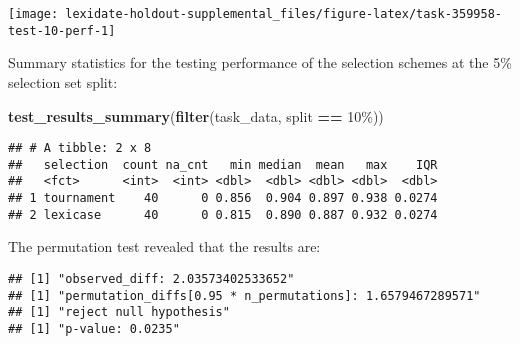 \documentclass[
]{book}
\newenvironment{Shaded}{\begin{snugshade}}{\end{snugshade}}
\newcommand{\AttributeTok}[1]{\textcolor[rgb]{0.13,0.29,0.53}{#1}}
\newcommand{\DecValTok}[1]{\textcolor[rgb]{0.00,0.00,0.81}{#1}}
\newcommand{\FunctionTok}[1]{\textcolor[rgb]{0.13,0.29,0.53}{\textbf{#1}}}
\newcommand{\NormalTok}[1]{#1}
\newcommand{\OtherTok}[1]{\textcolor[rgb]{0.56,0.35,0.01}{#1}}
\newcommand{\SpecialCharTok}[1]{\textcolor[rgb]{0.81,0.36,0.00}{\textbf{#1}}}
\newcommand{\StringTok}[1]{\textcolor[rgb]{0.31,0.60,0.02}{#1}}
\begin{document}
\texttt{[image: lexidate-holdout-supplemental\_files/figure-latex/task-359958-test-10-perf-1]}

Summary statistics for the testing performance of the selection schemes at the 5\% selection set split:

\begin{Shaded}
\begin{Highlighting}[]
\FunctionTok{test\_results\_summary}\NormalTok{(}\FunctionTok{filter}\NormalTok{(task\_data, split }\SpecialCharTok{==} \StringTok{\textquotesingle{}10\%\textquotesingle{}}\NormalTok{))}
\end{Highlighting}
\end{Shaded}

\begin{verbatim}
## # A tibble: 2 x 8
##   selection  count na_cnt   min median  mean   max    IQR
##   <fct>      <int>  <int> <dbl>  <dbl> <dbl> <dbl>  <dbl>
## 1 tournament    40      0 0.856  0.904 0.897 0.938 0.0274
## 2 lexicase      40      0 0.815  0.890 0.887 0.932 0.0274
\end{verbatim}

The permutation test revealed that the results are:

\begin{Shaded}
\end{Shaded}

\begin{verbatim}
## [1] "observed_diff: 2.03573402533652"
## [1] "permutation_diffs[0.95 * n_permutations]: 1.6579467289571"
## [1] "reject null hypothesis"
## [1] "p-value: 0.0235"
\end{verbatim}
\end{document}
